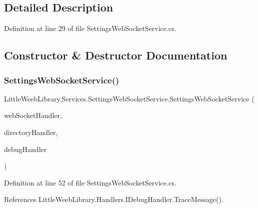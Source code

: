 \subsection{Detailed Description}


Definition at line 29 of file Settings\+Web\+Socket\+Service.\+cs.



\subsection{Constructor \& Destructor Documentation}
\mbox{\label{class_little_weeb_library_1_1_services_1_1_settings_web_socket_service_aaaa502b8a0362b6852d909887727bddb}} 
\subsubsection{\texorpdfstring{Settings\+Web\+Socket\+Service()}{SettingsWebSocketService()}}
{\footnotesize\ttfamily Little\+Weeb\+Library.\+Services.\+Settings\+Web\+Socket\+Service.\+Settings\+Web\+Socket\+Service (\begin{DoxyParamCaption}\item[{\mbox{\hyperlink{interface_little_weeb_library_1_1_handlers_1_1_i_web_socket_handler}{I\+Web\+Socket\+Handler}}}]{web\+Socket\+Handler,  }\item[{\mbox{\hyperlink{interface_little_weeb_library_1_1_handlers_1_1_i_directory_handler}{I\+Directory\+Handler}}}]{directory\+Handler,  }\item[{\mbox{\hyperlink{interface_little_weeb_library_1_1_handlers_1_1_i_debug_handler}{I\+Debug\+Handler}}}]{debug\+Handler }\end{DoxyParamCaption})}



Definition at line 52 of file Settings\+Web\+Socket\+Service.\+cs.



References Little\+Weeb\+Library.\+Handlers.\+I\+Debug\+Handler.\+Trace\+Message().


